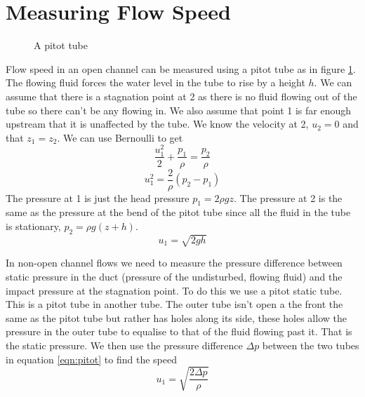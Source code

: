 \documentclass{article}
\begin{document}
    \section{Measuring Flow Speed}
    \begin{figure}[ht]
        \centering
        \caption{A pitot tube}
        \label{fig:pitot tube}
    \end{figure}
    Flow speed in an open channel can be measured using a pitot tube as in figure \ref{fig:pitot tube}.
    The flowing fluid forces the water level in the tube to rise by a height \(h\).
    We can assume that there is a stagnation point at 2 as there is no fluid flowing out of the tube so there can't be any flowing in.
    We also assume that point 1 is far enough upstream that it is unaffected by the tube.
    We know the velocity at 2, \(u_2 = 0\) and that \(z_1 = z_2\).
    We can use Bernoulli to get
    \[\frac{u_1^2}{2} + \frac{p_1}{\rho} = \frac{p_2}{\rho}\]
    \begin{equation}\label{eqn:pitot}
        u_1^2 = \frac{2}{\rho}(p_2 - p_1)
    \end{equation}
    The pressure at 1 is just the head pressure \(p_1 = 2\rho gz\).
    The pressure at 2 is the same as the pressure at the bend of the pitot tube since all the fluid in the tube is stationary, \(p_2 = \rho g(z + h)\).
    \[u_1 = \sqrt{2gh}\]
    
    In non-open channel flows we need to measure the pressure difference between static pressure in the duct (pressure of the undisturbed, flowing fluid) and the impact pressure at the stagnation point.
    To do this we use a pitot static tube.
    This is a pitot tube in another tube. The outer tube isn't open a the front the same as the pitot tube but rather has holes along its side, these holes allow the pressure in the outer tube to equalise to that of the fluid flowing past it.
    That is the static pressure.
    We then use the pressure difference \(\Delta p\) between the two tubes in equation \ref{eqn:pitot} to find the speed
    \[u_1 = \sqrt{\frac{2\Delta p}{\rho}}\]
    
\end{document}
